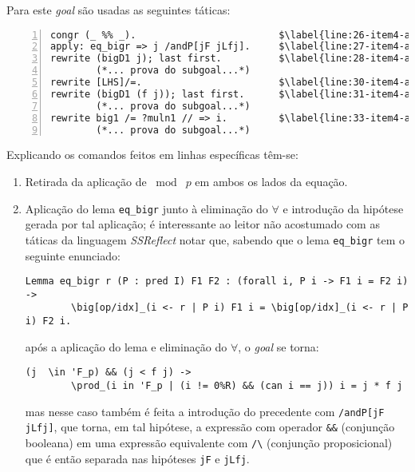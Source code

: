 \begin{enumerate}[label=\textbf{\roman*.}]
\begin{enumerate}[label=\textbf{\roman{enumi}.(\alph*)}]
                Para este \textit{goal} são usadas as seguintes táticas:
                
                        \begin{lstlisting}[language=coq,frame=single, numbers=left,stepnumber=1,tabsize=1, escapechar=\$, name=proof]
congr (_ %% _).                         $\label{line:26-item4-a}$
apply: eq_bigr => j /andP[jF jLfj].     $\label{line:27-item4-a}$
rewrite (bigD1 j); last first.          $\label{line:28-item4-a}$
        (*... prova do subgoal...*)
rewrite [LHS]/=.                        $\label{line:30-item4-a}$
rewrite (bigD1 (f j)); last first.      $\label{line:31-item4-a}$
        (*... prova do subgoal...*)
rewrite big1 /= ?muln1 // => i.         $\label{line:33-item4-a}$
        (*... prova do subgoal...*)
                        \end{lstlisting}
                
                Explicando os comandos feitos em linhas específicas têm-se:
        
                \begin{enumerate}[listparindent=\parindent]
                
                        \item[\textbf{(\ref{line:26-item4-a})}] Retirada da aplicação de $\bmod \; p$ em ambos os lados da equação.
                
                        \item[\textbf{(\ref{line:27-item4-a})}] Aplicação do lema \lstinline[language=coq]|eq_bigr| junto à eliminação do $\forall$ e introdução da hipótese gerada por tal aplicação; é interessante ao leitor não acostumado com as táticas da linguagem \textit{SSReflect} notar que, sabendo que o lema \lstinline[language=coq]|eq_bigr| tem o seguinte enunciado:
        
                                \begin{lstlisting}[language=coq,frame=single,tabsize=1]
Lemma eq_bigr r (P : pred I) F1 F2 : (forall i, P i -> F1 i = F2 i) ->
        \big[op/idx]_(i <- r | P i) F1 i = \big[op/idx]_(i <- r | P i) F2 i.
                                \end{lstlisting}
                        após a aplicação do lema e eliminação do $\forall$, o \textit{goal} se torna:
                        
                                \begin{lstlisting}[language=coq,frame=single,tabsize=1]
(j  \in 'F_p) && (j < f j) -> 
        \prod_(i in 'F_p | (i != 0%R) && (can i == j)) i = j * f j
                                \end{lstlisting}
                        mas nesse caso também é feita a introdução do precedente com \lstinline[language=coq]|/andP[jF jLfj]|, que torna, em tal hipótese, a expressão com operador \lstinline[language=coq]|&&| (conjunção booleana) em uma expressão equivalente com \lstinline[language=coq]|/\| (conjunção proposicional) que é então separada nas hipóteses \lstinline[language=coq]|jF| e \lstinline[language=coq]|jLfj|.
                        

\end{enumerate}
\end{enumerate}
\end{enumerate}
